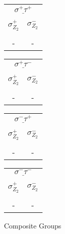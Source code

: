 \documentclass[12pt]{article}
\begin{document}
\begin{center}
\begin{tabular}{| c | c |}
\multicolumn{2}{c}{$\underline{\sigma^+ \tau^+}$} \\[-1em]
\multicolumn{1}{c}{} & \multicolumn{1}{c}{} \\
\multicolumn{1}{c}{$\sigma_{Z_2}^+$} & \multicolumn{1}{c}{$\sigma_{Z_2}^-$} \\[-1em]
\multicolumn{1}{c}{} & \multicolumn{1}{c}{} \\
\hline
- & - \\
\hline
\end{tabular} 
\hspace{1.2cm}
\begin{tabular}{| c | c |}
\multicolumn{2}{c}{$\underline{\sigma^+ \tau^-}$} \\[-1em]
\multicolumn{1}{c}{} & \multicolumn{1}{c}{} \\
\multicolumn{1}{c}{$\sigma_{Z_2}^+$} & \multicolumn{1}{c}{$\sigma_{Z_2}^-$} \\[-1em]
\multicolumn{1}{c}{} & \multicolumn{1}{c}{} \\
\hline
- & - \\
\hline
\end{tabular} 
\hspace{1.2cm}
\begin{tabular}{| c | c |}
\multicolumn{2}{c}{$\underline{\sigma^- \tau^+}$} \\[-1em]
\multicolumn{1}{c}{} & \multicolumn{1}{c}{} \\
\multicolumn{1}{c}{$\sigma_{Z_2}^+$} & \multicolumn{1}{c}{$\sigma_{Z_2}^-$} \\[-1em]
\multicolumn{1}{c}{} & \multicolumn{1}{c}{} \\
\hline
- & - \\
\hline
\end{tabular} 
\hspace{1.2cm}
\begin{tabular}{| c | c |}
\multicolumn{2}{c}{$\underline{\sigma^- \tau^-}$} \\[-1em]
\multicolumn{1}{c}{} & \multicolumn{1}{c}{} \\
\multicolumn{1}{c}{$\sigma_{Z_2}^+$} & \multicolumn{1}{c}{$\sigma_{Z_2}^-$} \\[-1em]
\multicolumn{1}{c}{} & \multicolumn{1}{c}{} \\
\hline
- & - \\
\hline
\end{tabular} 
\vspace{.6cm}

\newpage
Composite Groups


\end{center}
\end{document}
